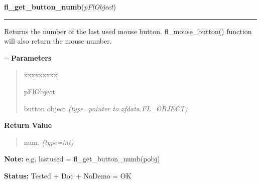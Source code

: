 \hspace{.8\funcindent}\begin{boxedminipage}{\funcwidth}

    \raggedright \textbf{fl\_get\_button\_numb}(\textit{pFlObject})

    \vspace{-1.5ex}

    \rule{\textwidth}{0.5\fboxrule}
\setlength{\parskip}{2ex}

Returns the number of the last used mouse button. fl\_mouse\_button()
function will also return the mouse number.

-{}-
\setlength{\parskip}{1ex}
      \textbf{Parameters}
      \vspace{-1ex}

      \begin{quote}
        \begin{Ventry}{xxxxxxxxx}

          \item[pFlObject]


button object
            {\it (type=pointer to xfdata.FL\_OBJECT)}

        \end{Ventry}

      \end{quote}

      \textbf{Return Value}
    \vspace{-1ex}

      \begin{quote}

num.
      {\it (type=int)}

      \end{quote}

\textbf{Note:} 
e.g. lastused = fl\_get\_button\_numb(pobj)


\textbf{Status:} 
Tested + Doc + NoDemo = OK


    \end{boxedminipage}

    \label{xformslib:flbutton:fl_create_generic_button}

    \vspace{0.5ex}

